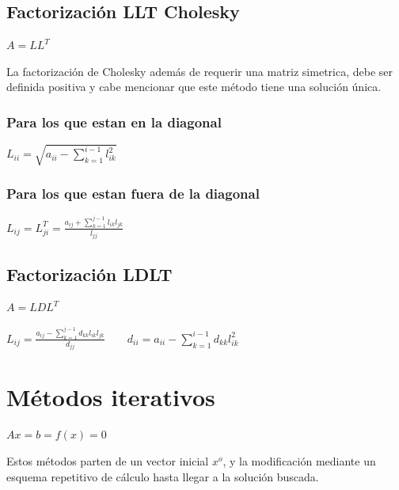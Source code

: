 \subsection{Factorizaci\'on LLT Cholesky}
\begin{center}
$ A=LL^T$
\end{center}
La factorizaci\'on de Cholesky adem\'as de requerir una matriz simetrica, debe ser definida positiva y cabe mencionar que este m\'etodo tiene una soluci\'on \'unica.
\subsubsection*{Para los que estan en la diagonal}
\begin{center}
$L_{ii}=\sqrt{a_{ii}-\sum_{k=1}^{i-1}l_{ik}^2}$
\subsubsection*{Para los que estan fuera de la diagonal}
\begin{center}
$L_{ij}=L^T_{ji}=\frac{a_{ij}+\sum_{k=1}^{j-1}l_{ik}l_{jk}}{l_{jj}}$
\end{center}
\end{center}
\subsection{Factorizaci\'on LDLT}
\begin{center}
$ A=LDL^T $
\end{center}
\begin{center}
$L_{ij}=\frac{a_{ij}-\sum_{k=1}^{j-1}d_{kk}l_{ik}l_{jk}}{d_{jj}} \qquad d_{ii}=a_{ii}-\sum_{k=1}^{i-1}d_{kk}l_{ik}^2$
\end{center}
\section{M\'etodos iterativos }
\begin{center}
$Ax=b=f(x)=0$
\end{center}
Estos m\'etodos parten de un vector inicial $x^o$, y la modificaci\'on mediante un esquema repetitivo de c\'alculo hasta llegar a la soluci\'on buscada.

